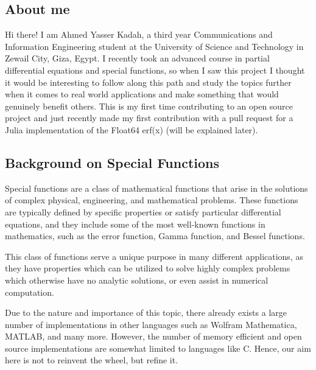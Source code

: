\documentclass{article}
\theoremstyle{mytheoremstyle}
\theoremstyle{mytheoremstyle}
\theoremstyle{myproblemstyle}
\begin{document}
    \subsection*{About me 
      \href{https://github.com/AhmedYKadah}{\faGithub}    
      \href{https://linkedin.com/in/ahmed-yasser-kadah-83687b269}{\faLinkedin}    
      \href{mailto:ahmadyassermo@gmail.com}{\faEnvelope[regular]}    
    }\label{sub:About} 
      Hi there! I am Ahmed Yasser Kadah, a third year Communications and Information Engineering student at the University of Science and Technology in Zewail City, Giza, Egypt.
      I recently took an advanced course in partial differential equations and special functions, so when I saw this project I thought it would be interesting to follow along this path and study the topics further when it comes to real world applications and make something that would genuinely benefit others. 
      This is my first time contributing to an open source project and just recently made my first contribution with a pull request for a Julia implementation of the Float64 erf(x) (will be explained later). \cite{pr} 





    \subsection*{Background on Special Functions}\label{sub:Background } %
    Special functions are a class of mathematical functions that arise in the solutions of complex physical, engineering, and mathematical problems.\cite{special functions}
   These functions are typically defined by specific properties or satisfy particular differential equations, and they include some of the most well-known functions in mathematics, such as the error function, Gamma function, and Bessel functions.

   This class of functions serve a unique purpose in many different applications, as they have properties which can be utilized to solve highly complex problems which otherwise have no analytic solutions, or even assist in numerical computation.


    Due to the nature and importance of this topic, there already exists a large number of implementations in other languages such as Wolfram Mathematica, MATLAB, and many more.
    However, the number of memory efficient and open source implementations are somewhat limited to languages like C. 
    Hence, our aim here is not to reinvent the wheel, but refine it. 
\end{document}
